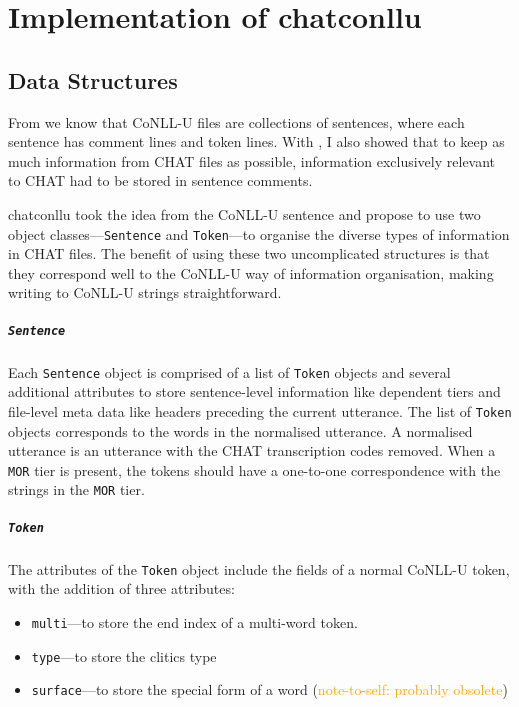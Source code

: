 \chapter{Implementation of chatconllu} %

\label{Chapter3} %

\section{Data Structures}
From  we know that CoNLL-U files are collections of sentences, where each sentence has comment lines and token lines. With , I also showed that to keep as much information from CHAT files as possible, information exclusively relevant to CHAT had to be stored in sentence comments.

chatconllu took the idea from the CoNLL-U sentence and propose to use two object classes---\texttt{Sentence} and \texttt{Token}---to organise the diverse types of information in CHAT files. The benefit of using these two uncomplicated structures is that they correspond well to the CoNLL-U way of information organisation, making writing to CoNLL-U strings straightforward.

\paragraph{\texttt{Sentence}}

Each \texttt{Sentence} object is comprised of a list of \texttt{Token} objects and several additional attributes to store sentence-level information like dependent tiers and file-level meta data like headers preceding the current utterance. The list of \texttt{Token} objects corresponds to the words in the normalised utterance. A normalised utterance is an utterance with the CHAT transcription codes removed. When a \texttt{MOR} tier is present, the tokens should have a one-to-one correspondence with the strings in the \texttt{MOR} tier.

\paragraph{\texttt{Token}}

The attributes of the \texttt{Token} object include the  fields of a normal CoNLL-U token, with the addition of three attributes:
\begin{itemize}
	\item \texttt{multi}---to store the end index of a multi-word token.
	\item \texttt{type}---to store the clitics type
	\item \texttt{surface}---to store the special form of a word (\textcolor{orange}{note-to-self: probably obsolete})
\end{itemize}

